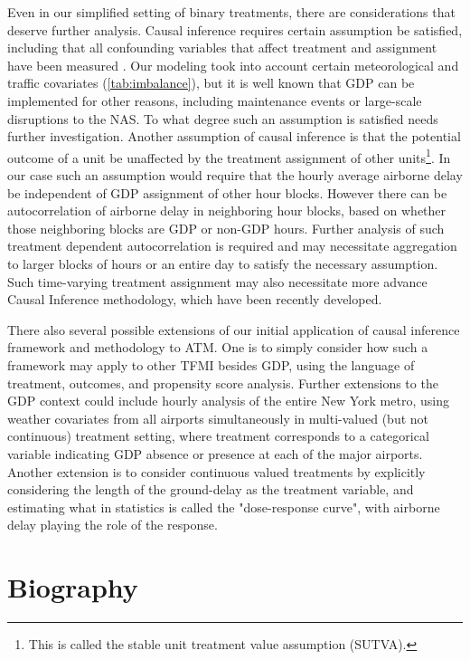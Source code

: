 \documentclass[conference]{IEEEtran}
\begin{document}
Even in our simplified setting of binary treatments, there are considerations that deserve further analysis.  Causal inference requires certain assumption be satisfied, including that all confounding variables that affect treatment and assignment have been measured \cite{austin2011introduction}.  Our modeling took into account certain meteorological and traffic covariates (\ref{tab:imbalance}), but it is well known that GDP can be implemented for other reasons, including maintenance events or large-scale disruptions to the NAS.  To what degree such an assumption is satisfied needs further investigation.  Another assumption of causal inference is that the potential outcome of a unit be unaffected by the treatment assignment of other units\footnote{This is called the stable unit treatment value assumption (SUTVA).}.  In our case such an assumption would require that the hourly average airborne delay be independent of GDP assignment of other hour blocks.  However there can be autocorrelation of airborne delay in neighboring hour blocks, based on whether those neighboring blocks are GDP or non-GDP hours.  Further analysis of such treatment dependent autocorrelation is required and may necessitate aggregation to larger blocks of hours or an entire day to satisfy the necessary assumption.  Such time-varying treatment assignment may also necessitate more advance Causal Inference methodology, which have been recently developed\cite{imai2015robust}. 

There also several possible extensions of our initial application of causal inference framework and methodology to ATM.  One is to simply consider how such a framework may apply to other TFMI besides GDP, using the language of treatment, outcomes, and propensity score analysis. Further extensions to the GDP context could include hourly analysis of the entire New York metro, using weather covariates from all airports simultaneously in multi-valued (but not continuous) treatment setting, where treatment corresponds to a categorical variable indicating GDP absence or presence at each of the major airports.  Another extension is to consider continuous valued treatments by explicitly considering the length of the ground-delay as the treatment variable, and estimating what in statistics is called the "dose-response curve"\cite{fong2017covariate}, with airborne delay playing the role of the response.    


\section{Biography}  
\end{document}
